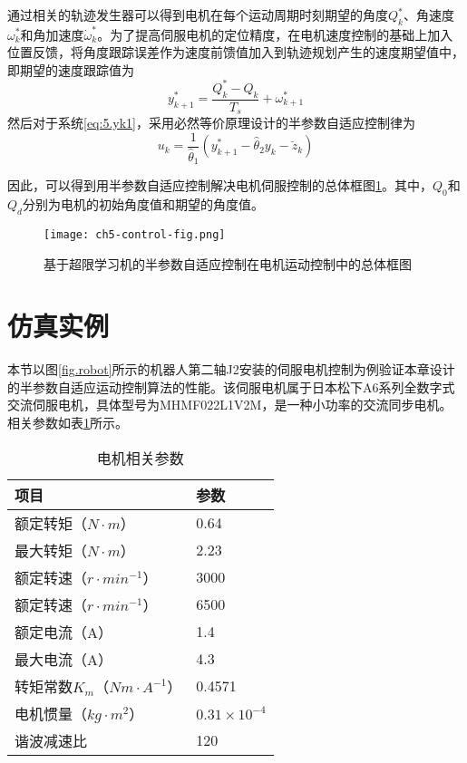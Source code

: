 通过相关的轨迹发生器可以得到电机在每个运动周期时刻期望的角度$Q_{k}^{*}$、角速度$\omega_{k}^{*}$和角加速度$\dot{\omega}_{k}^{*}$。为了提高伺服电机的定位精度，在电机速度控制的基础上加入位置反馈，将角度跟踪误差作为速度前馈值加入到轨迹规划产生的速度期望值中，即期望的速度跟踪值为
$$y_{k+1}^{*}=\frac{Q_{k}^{*}-Q_{k}}{T_{s}}+\omega_{k+1}^{*}$$
然后对于系统\ref{eq:5.yk1}，采用必然等价原理设计的半参数自适应控制律为
\begin{equation}\label{eq:5.uk}
u_{k} = \frac{1}{\hat{\theta}_{1}}(y^{*}_{k+1}-\hat{\theta}_{2}y_{k}-\breve{z}_{k})
\end{equation}

因此，可以得到用半参数自适应控制解决电机伺服控制的总体框图\ref{fig.control.motor}。其中，$Q_{0}$和$Q_{d}$分别为电机的初始角度值和期望的角度值。
\begin{figure}[!htb]
	\centering
	\texttt{[image: ch5-control-fig.png]}\\	 %
	\caption{基于超限学习机的半参数自适应控制在电机运动控制中的总体框图}
	\label{fig.control.motor}
\end{figure}

\section{仿真实例}
本节以图\ref{fig.robot}所示的机器人第二轴J2安装的伺服电机控制为例验证本章设计的半参数自适应运动控制算法的性能。该伺服电机属于日本松下A6系列全数字式交流伺服电机，具体型号为MHMF022L1V2M，是一种小功率的交流同步电机。相关参数如表\ref{tab:motor}所示。
\begin{table}
\centering
\caption{电机相关参数}\label{tab:motor}
\begin{tabular*}{0.9\textwidth}{@{\extracolsep{\fill}}ll}
\toprule
项目&参数\\
\midrule
额定转矩（$N\cdot m$）&0.64\\
最大转矩（$N\cdot m$）&2.23\\
额定转速（$r\cdot min^{-1}$）&3000\\
额定转速（$r\cdot min^{-1}$）&6500\\
额定电流（A）&1.4\\
最大电流（A）&4.3\\
转矩常数$K_{m}$（$Nm\cdot A^{-1}$）& 0.4571\\
电机惯量（$kg\cdot m^{2}$）&$0.31\times10^{-4}$\\
谐波减速比&120\\
\bottomrule
\end{tabular*}
\end{table}

